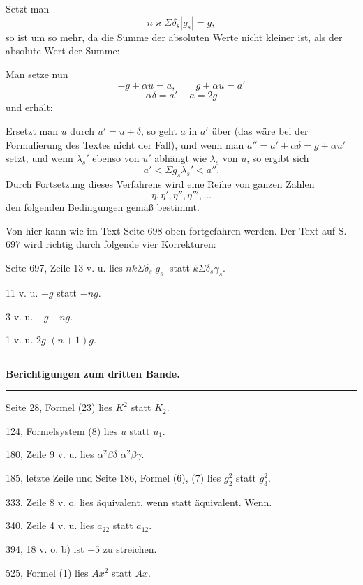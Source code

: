 Setzt man
\[
n\varkappa\Sigma\delta_s|g_s| = g,
\]
so ist um so mehr, da die Summe der absoluten Werte nicht kleiner ist, als der absolute Wert der Summe:

Man setze nun
\[
-g + \alpha u = a, \qquad g + \alpha u = a'
\]
\[
\alpha\delta = a' - a = 2g
\]
und erhält:

Ersetzt man $u$ durch $u' = u + \delta$, so geht $a$ in $a'$ über (das wäre bei der Formulierung des Textes nicht der Fall), und wenn man $a'' = a' + \alpha\delta = g + \alpha u'$ setzt, und wenn $\lambda_s'$ ebenso von $u'$ abhängt wie $\lambda_s$ von $u$, so ergibt sich
\[
a' < \Sigma g_s\lambda_s' < a''.
\]
Durch Fortsetzung dieses Verfahrens wird eine Reihe von ganzen Zahlen
\[
\eta, \eta', \eta'', \eta''', \ldots
\]
den folgenden Bedingungen gemäß bestimmt.

Von hier kann wie im Text Seite 698 oben fortgefahren werden. Der Text auf S. 697 wird richtig durch folgende vier Korrekturen:

Seite 697, Zeile 13 v. u. lies $nk\Sigma\delta_s|g_s|$ statt $k\Sigma\delta_s\gamma_s$.

\glqq{} 11 v. u. \glqq{} $-g$ statt $-ng$.

\glqq{} 3 v. u. \glqq{} $-g$ \glqq{} $-ng$.

\glqq{} 1 v. u. \glqq{} $2g$ \glqq{} $(n+1)g$.

\begin{center}
\rule{3cm}{0.4pt}
\end{center}

\begin{center}
\textbf{Berichtigungen zum dritten Bande.}
\end{center}

\begin{center}
\rule{3cm}{0.4pt}
\end{center}

Seite 28, Formel (23) lies $K^2$ statt $K_2$.

\glqq{} 124, Formelsystem (8) lies $u$ statt $u_1$.

\glqq{} 180, Zeile 9 v. u. lies $\alpha^2\beta\delta$ \glqq{} $\alpha^2\beta\gamma$.

\glqq{} 185, letzte Zeile und Seite 186, Formel (6), (7) lies $g_2^2$ statt $g_3^2$.

\glqq{} 333, Zeile 8 v. o. lies äquivalent, wenn statt äquivalent. Wenn.

\glqq{} 340, Zeile 4 v. u. lies $a_{22}$ statt $a_{12}$.

\glqq{} 394, \glqq{} 18 v. o. b) ist $-5$ zu streichen.

\glqq{} 525, Formel (1) lies $Ax^2$ statt $Ax$.

\begin{center}
\makebox[3cm]{\dotfill}
\end{center}
